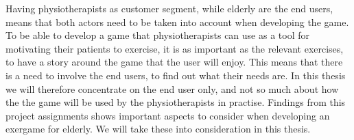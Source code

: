 Having physiotherapists as customer segment, while elderly are the end users, means that both actors need to be taken into account when developing the game. To be able to develop a game that physiotherapists can use as a tool for motivating their patients to exercise, it is as important as the relevant exercises, to have a story around the game that the user will enjoy. This means that there is a need to involve the end users, to find out what their needs are. In this thesis we will therefore concentrate on the end user only, and not so much about how the the game will be used by the physiotherapists in practise. Findings from this project assignments shows important aspects to consider when developing an exergame for elderly. We will take these into consideration in this thesis.